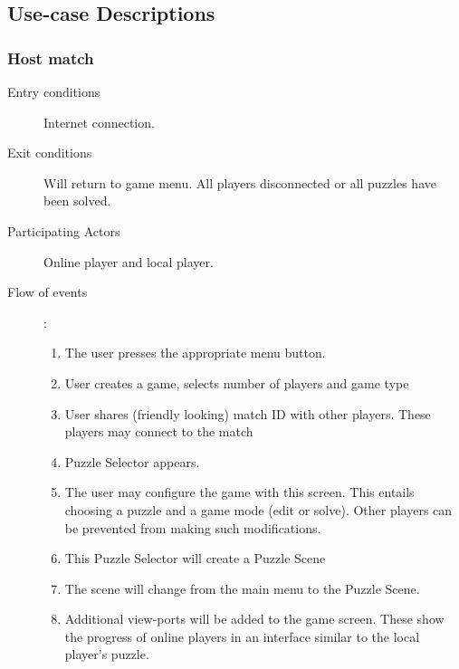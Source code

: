\documentclass[12pt]{article}
\begin{document}
\subsection{Use-case Descriptions}
\begin{mdframed}
    \subsubsection{Host match}
    \begin{description}
        \item[Entry conditions] Internet connection.
        \item[Exit conditions] Will return to game menu. All players
            disconnected or all puzzles have been solved.
        \item[Participating Actors] Online player and local player.
        \item[Flow of events]:
            \begin{enumerate}
                \item The user presses the appropriate menu button.
                \item User creates a game, selects number of players and game
                    type
                \item User shares (friendly looking) match ID with other
                    players. These players may connect to the match
                \item Puzzle Selector appears.
                \item The user may configure the game with this screen.
                    This
                    entails choosing a puzzle and a game mode (edit or solve).
                    Other players can be prevented from making such
                    modifications.
                \item This Puzzle Selector will create a Puzzle Scene
                \item The scene will change from the main menu to the Puzzle
                    Scene.
                \item Additional view-ports will be added to the game screen. 
                These show the progress of online players in an interface
                similar to the local player's puzzle.

            \end{enumerate}
    \end{description}
\end{mdframed}
\end{document}
